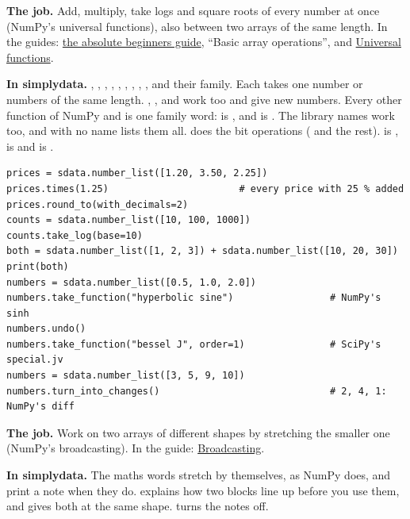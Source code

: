 
\textbf{The job.} Add, multiply, take logs and square roots of every number at once (NumPy's universal
functions), also between two arrays of the same length. In the guides:
\href{https://numpy.org/doc/stable/user/absolute_beginners.html}{the absolute beginners guide}, ``Basic
array operations'', and \href{https://numpy.org/doc/stable/user/basics.ufuncs.html}{Universal
functions}.

\textbf{In simplydata.} , , , ,
, , , ,
,  and their family. Each takes one number or numbers of the same
length. \code{+}, \code{-}, \code{*} and \code{/} work too and give new numbers.
Every other function of NumPy and  is one family word:
 is , and
 is . The library names work too, and
 with no name lists them all.  does the bit operations
( and the rest).  is ,
 is  and  is .

\begin{lstlisting}[style=py]
prices = sdata.number_list([1.20, 3.50, 2.25])
prices.times(1.25)                       # every price with 25 % added
prices.round_to(with_decimals=2)
counts = sdata.number_list([10, 100, 1000])
counts.take_log(base=10)
both = sdata.number_list([1, 2, 3]) + sdata.number_list([10, 20, 30])
print(both)
numbers = sdata.number_list([0.5, 1.0, 2.0])
numbers.take_function("hyperbolic sine")                 # NumPy's sinh
numbers.undo()
numbers.take_function("bessel J", order=1)               # SciPy's special.jv
numbers = sdata.number_list([3, 5, 9, 10])
numbers.turn_into_changes()                              # 2, 4, 1: NumPy's diff
\end{lstlisting}


\textbf{The job.} Work on two arrays of different shapes by stretching the smaller one (NumPy's
broadcasting). In the guide: \href{https://numpy.org/doc/stable/user/basics.broadcasting.html}%
{Broadcasting}.

\textbf{In simplydata.} The maths words stretch by themselves, as NumPy does, and print a note when
they do.  explains how two blocks line up before you
use them, and  gives both at the same shape.
 turns the notes off.

